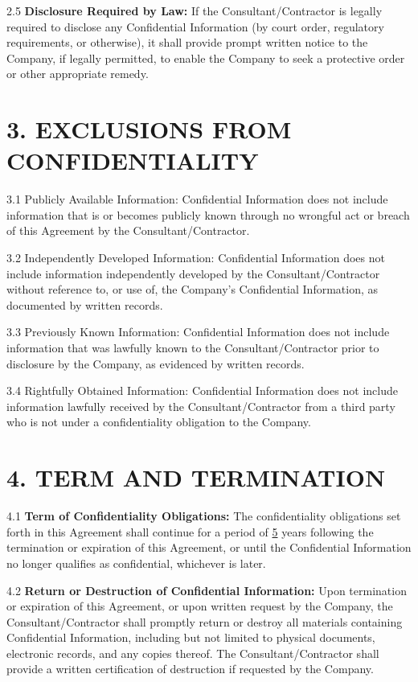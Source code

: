 \documentclass[12pt]{article}
\begin{document}
2.5 \textbf{Disclosure Required by Law:} If the Consultant/Contractor is legally required to disclose any Confidential Information (by court order, regulatory requirements, or otherwise), it shall provide prompt written notice to the Company, if legally permitted, to enable the Company to seek a protective order or other appropriate remedy.

\section*{3. EXCLUSIONS FROM CONFIDENTIALITY}

3.1 Publicly Available Information: Confidential Information does not include information that is or becomes publicly known through no wrongful act or breach of this Agreement by the Consultant/Contractor.

3.2 Independently Developed Information: Confidential Information does not include information independently developed by the Consultant/Contractor without reference to, or use of, the Company's Confidential Information, as documented by written records.

3.3 Previously Known Information: Confidential Information does not include information that was lawfully known to the Consultant/Contractor prior to disclosure by the Company, as evidenced by written records.

3.4 Rightfully Obtained Information: Confidential Information does not include information lawfully received by the Consultant/Contractor from a third party who is not under a confidentiality obligation to the Company.

\section*{4. TERM AND TERMINATION}

4.1 \textbf{Term of Confidentiality Obligations:} The confidentiality obligations set forth in this Agreement shall continue for a period of \underline{5} years following the termination or expiration of this Agreement, or until the Confidential Information no longer qualifies as confidential, whichever is later.

4.2 \textbf{Return or Destruction of Confidential Information:} Upon termination or expiration of this Agreement, or upon written request by the Company, the Consultant/Contractor shall promptly return or destroy all materials containing Confidential Information, including but not limited to physical documents, electronic records, and any copies thereof. The Consultant/Contractor shall provide a written certification of destruction if requested by the Company.
\end{document}
